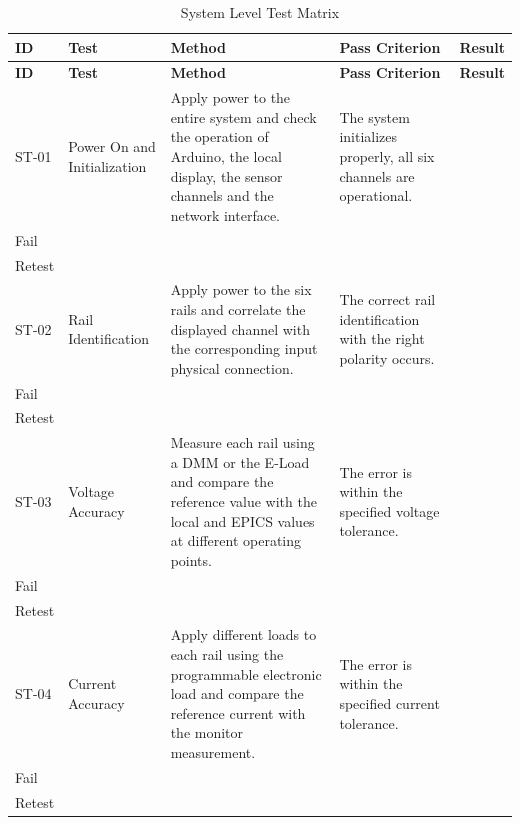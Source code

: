 \newcommand{\testresult}[1]{%
	\begin{tabular}[t]{@{}l@{}}
		\CheckBox[name=#1-pass,width=1.1em,height=1.1em]{} Pass \\[0.25em]
		\CheckBox[name=#1-fail,width=1.1em,height=1.1em]{} Fail \\[0.25em]
		\CheckBox[name=#1-retest,width=1.1em,height=1.1em]{} Retest
	\end{tabular}%
}
\begin{Form}
	
	\begin{longtable}{
			p{}
			p{}
			p{}
			p{}
			p{}
		}
		\caption{System Level Test Matrix}
		\label{tab:system-test-matrix} \\
		
		\toprule
		\textbf{ID} &
		\textbf{Test} &
		\textbf{Method} &
		\textbf{Pass Criterion} &
		\textbf{Result} \\
		\midrule
		\endfirsthead
		
		\toprule
		\textbf{ID} &
		\textbf{Test} &
		\textbf{Method} &
		\textbf{Pass Criterion} &
		\textbf{Result} \\
		\midrule
		\endhead
		
		ST-01 &
		Power On and Initialization &
		Apply power to the entire system and check the operation of Arduino, the local
		display, the sensor channels and the network interface. &
		The system initializes properly, all six channels are operational. &
		\testresult{ST01} \\
		
		\addlinespace[0.4em]
		
		ST-02 &
		Rail Identification &
		Apply power to the six rails and correlate the displayed channel with the
		corresponding input physical connection. &
		The correct rail identification with the right polarity occurs. &
		\testresult{ST02} \\
		
		\addlinespace[0.4em]
		
		ST-03 &
		Voltage Accuracy &
		Measure each rail using a DMM or the E-Load and compare the reference value
		with the local and EPICS values at different operating points. &
		The error is within the specified voltage tolerance. &
		\testresult{ST03} \\
		
		\addlinespace[0.4em]
		
		ST-04 &
		Current Accuracy &
		Apply different loads to each rail using the programmable electronic load and
		compare the reference current with the monitor measurement. &
		The error is within the specified current tolerance. &
		\testresult{ST04} \\
		

\end{longtable}
\end{Form}
